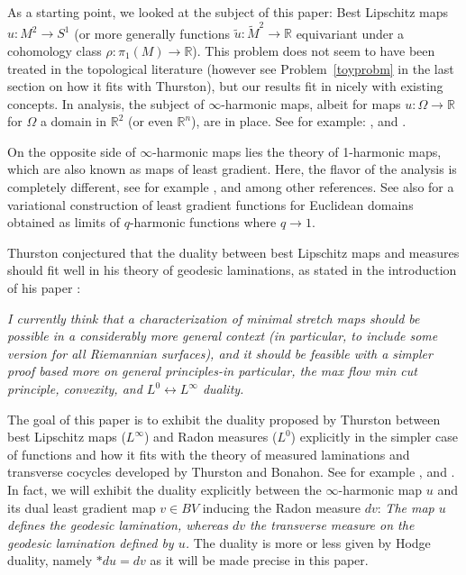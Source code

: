 \documentclass{ip-journal}
\theoremstyle{definition}
\numberwithin{equation}{section}
\newcommand{\R}{\mathbb R}
\begin{document}
As a starting point, we looked at the subject of this paper: Best Lipschitz maps $u: M^2 \rightarrow S^1$ (or more generally functions  $\tilde u: \tilde M^2 \rightarrow \R$ equivariant under a cohomology class $\rho: \pi_1(M) \rightarrow \R$). This problem does not seem to have been treated in the topological literature (however see Problem~\ref{toyprobm} in the last section on how it fits with Thurston), but our results fit in nicely with existing concepts. In analysis, the subject of $\infty$-harmonic maps, albeit for maps $u: \Omega \rightarrow \R$ for $\Omega$ a domain in $\R^2$ (or even $\R^n$), are in place. See for example: \cite{crandal}, \cite{evans-savin} and \cite{evans-smart}. 

On the opposite side of $\infty$-harmonic maps lies the theory of 1-harmonic maps, which are also known as maps of least gradient. Here, the flavor of the analysis is completely different, see for example \cite{ziemer}, \cite{ziemer2} and \cite{mazon} among other references. See also \cite{juutinen} for a variational construction of least gradient functions for Euclidean domains obtained as limits of $q$-harmonic functions where $q \rightarrow 1$. 

 Thurston  conjectured  that the duality between best Lipschitz maps and measures  should fit well in his theory of geodesic laminations, as stated in the introduction of his paper \cite{thurston}:

{\it I currently think that a characterization of minimal stretch maps should be possible in a considerably more general context (in particular, to include some version for all Riemannian surfaces), and it should be feasible with a simpler proof based more on general principles-in particular, the max flow min cut principle, convexity, and $L^0 \leftrightarrow L^\infty$ duality.}

The goal of this paper is to exhibit the duality proposed by Thurston between best Lipschitz maps ($L^\infty$) and Radon measures ($L^0$) explicitly in the simpler case of functions  and how it fits with the theory of measured laminations and transverse cocycles developed by Thurston and Bonahon. See for example \cite{thurston2}, \cite{bonahon1} and \cite{bonahon2}. In fact,  we will exhibit  the duality  explicitly between the $\infty$-harmonic map $u$ and its dual least gradient map $v \in BV$ inducing the Radon measure $dv$: {\it The map $u$ defines the geodesic lamination, whereas $dv$ the transverse measure on the geodesic lamination defined by $u$.} The duality is more or less given by Hodge duality, namely $*du=dv$ as it will be made precise in this paper.
\end{document}
